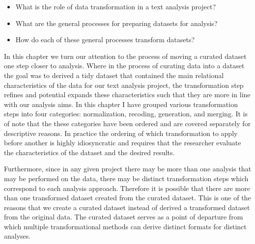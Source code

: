 \documentclass[
  letterpaper,
]{latex/krantz}
\providecommand{\tightlist}{%
  \setlength{\itemsep}{0pt}\setlength{\parskip}{0pt}}\usepackage{longtable,booktabs,array}
\begin{document}
\begin{tcolorbox}[enhanced jigsaw, colframe=quarto-callout-note-color-frame, titlerule=0mm, coltitle=black, colback=white, opacitybacktitle=0.6, colbacktitle=quarto-callout-note-color!10!white, left=2mm, arc=.35mm, leftrule=.75mm, rightrule=.15mm, bottomtitle=1mm, toptitle=1mm, breakable, bottomrule=.15mm, title=\textcolor{quarto-callout-note-color}{\faInfo}\hspace{0.5em}{Keys}, toprule=.15mm, opacityback=0]

\begin{itemize}
\tightlist
\item
  What is the role of data transformation in a text analysis project?
\item
  What are the general processes for preparing datasets for analysis?
\item
  How do each of these general processes transform datasets?
\end{itemize}

\end{tcolorbox}

In this chapter we turn our attention to the process of moving a curated
dataset one step closer to analysis. Where in the process of curating
data into a dataset the goal was to derived a tidy dataset that
contained the main relational characteristics of the data for our text
analysis project, the transformation step refines and potential expands
these characteristics such that they are more in line with our analysis
aims. In this chapter I have grouped various transformation steps into
four categories: normalization, recoding, generation, and merging. It is
of note that the these categories have been ordered and are covered
separately for descriptive reasons. In practice the ordering of which
transformation to apply before another is highly idiosyncratic and
requires that the researcher evaluate the characteristics of the dataset
and the desired results.

Furthermore, since in any given project there may be more than one
analysis that may be performed on the data, there may be distinct
transformation steps which correspond to each analysis approach.
Therefore it is possible that there are more than one transformed
dataset created from the curated dataset. This is one of the reasons
that we create a curated dataset instead of derived a transformed
dataset from the original data. The curated dataset serves as a point of
departure from which multiple transformational methods can derive
distinct formats for distinct analyses.
\end{document}
